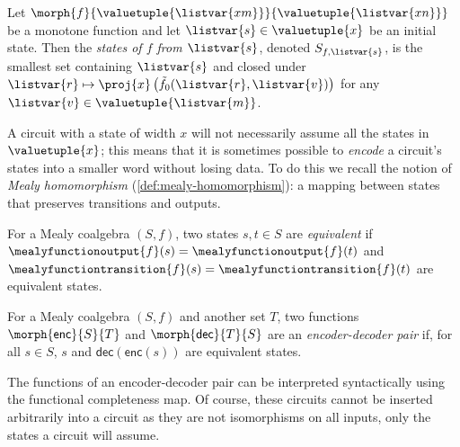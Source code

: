 \begin{definition}[States]
    Let \(\morph{f}{\valuetuple{\listvar{xm}}}{\valuetuple{\listvar{xn}}}\) be a
    monotone function and let \(\listvar{s} \in  \valuetuple{x}\) be an
    initial state.
    Then the \emph{states of \(f\) from \(\listvar{s}\)}, denoted
    \(S_{f,\listvar{s}}\), is the smallest set containing \(\listvar{s}\) and
    closed under \(
    \listvar{r}
    \mapsto
    \proj{x}\left(\tilde{f}_0(\listvar{r},\listvar{v})\right)
    \) for any \(\listvar{v} \in \valuetuple{\listvar{m}}\).
\end{definition}

A circuit with a state of width \(x\) will not necessarily assume all the states
in \(\valuetuple{x}\); this means that it is sometimes possible to \emph{encode}
a circuit's states into a smaller word without losing data.
To do this we recall the notion of \emph{Mealy homomorphism}
(\cref{def:mealy-homomorphism}): a mapping between states that preserves
transitions and outputs.

\begin{definition}\label{def:equivalent-states}
    For a Mealy coalgebra \((S, f)\), two states \(s,t \in S\) are
    \emph{equivalent} if
    \(\mealyfunctionoutput{f}(s) = \mealyfunctionoutput{f}(t)\) and
    \(\mealyfunctiontransition{f}(s) = \mealyfunctiontransition{f}(t)\) are
    equivalent states.
\end{definition}

\begin{definition}\label{def:encoder-decoder}
    For a Mealy coalgebra \((S, f)\) and another set \(T\), two functions
    \(\morph{\mathsf{enc}}{S}{T}\) and \(\morph{\mathsf{dec}}{T}{S}\) are an
    \emph{encoder-decoder pair} if, for all \(s \in S\),
    \(s\) and \(\mathsf{dec}(\mathsf{enc}(s))\) are equivalent states.
\end{definition}

The functions of an encoder-decoder pair can be interpreted syntactically using
the functional completeness map.
Of course, these circuits cannot be inserted arbitrarily into a circuit as they
are not isomorphisms on all inputs, only the states a circuit will assume.

